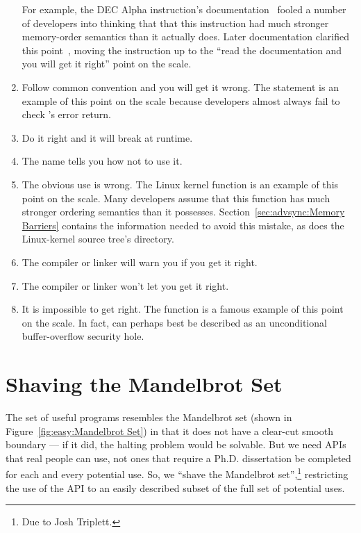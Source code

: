 \begin{enumerate}
	For example, the DEC Alpha  instruction's
	documentation~\cite{ALPHA95} fooled a
	number of developers into thinking that that this instruction
	had much stronger memory-order semantics than it actually does.
	Later documentation clarified this point~\cite{Compaq01},
	moving the  instruction up to the
	``read the documentation and you will get it right'' point on
	the scale.
\item	Follow common convention and you will get it wrong.
	The  statement is an example of this point on the
	scale because
	developers almost always fail to check 's error return.
\item	Do it right and it will break at runtime.
\item	The name tells you how not to use it.
\item	The obvious use is wrong.
	The Linux kernel  function is an example of
	this point on the scale.
	Many developers assume that this function has much
	stronger ordering semantics than it possesses.
	Section~\ref{sec:advsync:Memory Barriers} contains the
	information needed to avoid this mistake, as does the
	Linux-kernel source tree's  directory.
\item	The compiler or linker will warn you if you get it right.
\item	The compiler or linker won't let you get it right.
\item	It is impossible to get right.
	The  function is a famous example of this point on
	the scale.
	In fact,  can perhaps best be described as
	an unconditional buffer-overflow security hole.
\end{enumerate}

\section{Shaving the Mandelbrot Set}
\label{sec:easy:Shaving the Mandelbrot Set}

The set of useful programs resembles the Mandelbrot set
(shown in Figure~\ref{fig:easy:Mandelbrot Set})
in that it does
not have a clear-cut smooth boundary --- if it did, the halting problem
would be solvable.
But we need APIs that real people can use, not ones that require a
Ph.D. dissertation be completed for each and every potential use.
So, we ``shave the Mandelbrot set'',\footnote{
	Due to Josh Triplett.}
restricting the use of the
API to an easily described subset of the full set of potential uses.

